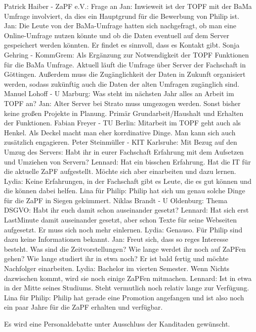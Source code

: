     \begin{outline}
      \1 Patrick Haiber - ZaPF e.V.:  Frage an Jan: Inwieweit ist der TOPF mit der BaMa Umfrage involviert, da dies ein Hauptgrund für die Bewerbung von Philip ist.
        \2 Jan: Die Leute von der BaMa-Umfrage hatten sich nachgefragt, ob man eine Online-Umfrage nutzen könnte und ob die Daten eventuell auf dem Server gespeichert werden könnten. Er findet es sinnvoll, dass es Kontakt gibt.
        \2 Sonja Gehring - KommGrem:  Als Ergänzung zur Notwendigkeit der TOPF Funktionen für die BaMa Umfrage. Aktuell läuft die Umfrage über Server der Fachschaft in Göttingen. Außerdem muss die Zugänglichkeit der Daten in Zukunft organisiert werden, sodass zukünftig auch die Daten der alten Umfragen zugänglich sind.
      \1 Manuel Lohoff - U Marburg:  Was steht im nächsten Jahr alles an Arbeit im TOPF an?
        \2 Jan: Alter Server bei Strato muss umgezogen werden. Sonst bisher keine großen Projekte in Planung. Primär Grundarbeit/Haushalt und Erhalten der Funktionen.
        \2 Fabian Freyer - TU Berlin:  Mitarbeit im TOPF geht auch als Henkel. Als Deckel macht man eher korrdinative Dinge. Man kann sich auch zusätzlich engagieren.
      \1 Peter Steinmüller - KIT Karlsruhe:  Mit Bezug auf den Umzug des Servers: Habt ihr in eurer Fachschaft Erfahrung mit dem Aufsetzen und Umziehen von Servern?
        \2 Lennard: Hat ein bisschen Erfahrung. Hat die IT für die aktuelle ZaPF aufgestellt. Möchte sich aber einarbeiten und dazu lernen.
        \2 Lydia: Keine Erfahrungen, in der Fachschaft gibt es Leute, die es gut können und die können dabei helfen.
        \2 Lina für Philip: Philip hat sich um genau solche Dinge für die ZaPF in Siegen gekümmert.
      \1 Niklas Brandt - U Oldenburg:  Thema DSGVO: Habt ihr euch damit schon auseinander gesetzt?
        \2 Lennard: Hat sich erst LastMinute damit auseinander gesetzt, aber schon Texte für seine Webseiten aufgesetzt. Er muss sich noch mehr einlernen.
        \2 Lydia: Genauso.
        \2 Für Philip sind dazu keine Informationen bekannt.
      \1 Jan: Freut sich, dass so reges Interesse besteht. Was sind die Zeitvorstellungen? Wie lange werdet ihr noch auf ZaPFen gehen? Wie lange studiert ihr in etwa noch? Er ist bald fertig und möchte Nachfolger einarbeiten.
        \2 Lydia: Bachelor im vierten Semester. Wenn Nichts dazwischen kommt, wird sie noch einige ZaPFen mitmachen.
        \2 Lennard: Ist in etwa in der Mitte seines Studiums. Steht vermutlich noch relativ lange zur Verfügung.
        \2 Lina für Philip: Philip hat gerade eine Promotion angefangen und ist also noch ein paar Jahre für die ZaPF erhalten und verfügbar.
    \end{outline}
    Es wird eine Personaldebatte unter Ausschluss der Kanditaden gewünscht.

